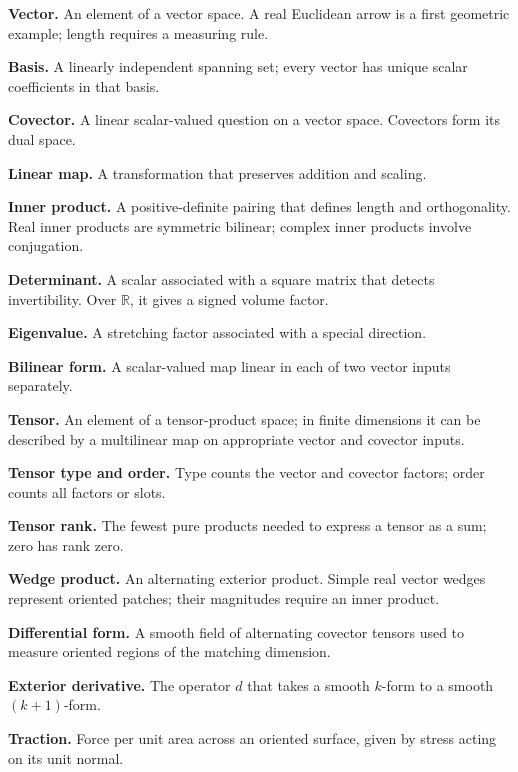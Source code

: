 \documentclass[10pt,oneside]{book}
\begin{document}
\textbf{Vector.} An element of a vector space. A real Euclidean arrow is a first geometric example; length requires a measuring rule.

\textbf{Basis.} A linearly independent spanning set; every vector has unique scalar coefficients in that basis.

\textbf{Covector.} A linear scalar-valued question on a vector space. Covectors form its dual space.

\textbf{Linear map.} A transformation that preserves addition and scaling.

\textbf{Inner product.} A positive-definite pairing that defines length and orthogonality. Real inner products are symmetric bilinear; complex inner products involve conjugation.

\textbf{Determinant.} A scalar associated with a square matrix that detects invertibility. Over $\mathbb R$, it gives a signed volume factor.

\textbf{Eigenvalue.} A stretching factor associated with a special direction.

\textbf{Bilinear form.} A scalar-valued map linear in each of two vector inputs separately.

\textbf{Tensor.} An element of a tensor-product space; in finite dimensions it can be described by a multilinear map on appropriate vector and covector inputs.

\textbf{Tensor type and order.} Type counts the vector and covector factors; order counts all factors or slots.

\textbf{Tensor rank.} The fewest pure products needed to express a tensor as a sum; zero has rank zero.

\textbf{Wedge product.} An alternating exterior product. Simple real vector wedges represent oriented patches; their magnitudes require an inner product.

\textbf{Differential form.} A smooth field of alternating covector tensors used to measure oriented regions of the matching dimension.

\textbf{Exterior derivative.} The operator $d$ that takes a smooth $k$-form to a smooth $(k+1)$-form.

\textbf{Traction.} Force per unit area across an oriented surface, given by stress acting on its unit normal.
\end{document}
